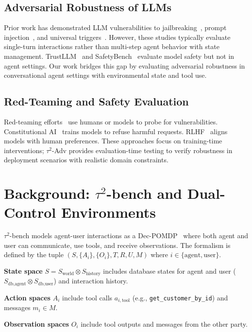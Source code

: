 \documentclass{article}
\newcommand{\tauadv}{$\tau^2$-Adv}
\newcommand{\taubench}{$\tau^2$-bench}
\begin{document}
\subsection{Adversarial Robustness of LLMs}

Prior work has demonstrated LLM vulnerabilities to jailbreaking~\cite{wei2023jailbroken}, prompt injection~\cite{perez2022ignore}, and universal triggers~\cite{wallace2019universal}. However, these studies typically evaluate single-turn interactions rather than multi-step agent behavior with state management. TrustLLM~\cite{sun2024trustllm} and SafetyBench~\cite{zhang2024safetybench} evaluate model safety but not in agent settings. Our work bridges this gap by evaluating adversarial robustness in conversational agent settings with environmental state and tool use.

\subsection{Red-Teaming and Safety Evaluation}

Red-teaming efforts~\cite{ganguli2022red,perez2022red} use humans or models to probe for vulnerabilities. Constitutional AI~\cite{bai2022constitutional} trains models to refuse harmful requests. RLHF~\cite{ouyang2022training} aligns models with human preferences. These approaches focus on training-time interventions; \tauadv{} provides evaluation-time testing to verify robustness in deployment scenarios with realistic domain constraints.

\section{Background: \taubench{} and Dual-Control Environments}

\taubench{} models agent-user interactions as a Dec-POMDP~\cite{oliehoek2016concise} where both agent and user can communicate, use tools, and receive observations. The formalism is defined by the tuple $(S, \{A_i\}, \{O_i\}, T, R, U, M)$ where $i \in \{\text{agent}, \text{user}\}$.

\textbf{State space} $S = S_{\text{world}} \otimes S_{\text{history}}$ includes database states for agent and user ($S_{\text{db,agent}} \otimes S_{\text{db,user}}$) and interaction history.

\textbf{Action spaces} $A_i$ include tool calls $a_{i,\text{tool}}$ (e.g., \texttt{get\_customer\_by\_id}) and messages $m_i \in M$.

\textbf{Observation spaces} $O_i$ include tool outputs and messages from the other party.
\end{document}
